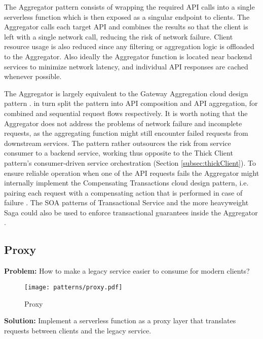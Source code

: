 The Aggregator pattern consists of wrapping the required API calls into a single serverless function which is then exposed as a singular endpoint to clients. The Aggregator calls each target API and combines the results so that the client is left with a single network call, reducing the risk of network failure. Client resource usage is also reduced since any filtering or aggregation logic is offloaded to the Aggregator. Also ideally the Aggregator function is located near backend services to minimize network latency, and individual API responses are cached whenever possible. \parencite{baldini17currentTrends}

The Aggregator is largely equivalent to the Gateway Aggregation cloud design pattern \parencite{microsoft18cloudPatterns}. \textcite{baldini17currentTrends} in turn split the pattern into API composition and API aggregation, for combined and sequential request flows respectively. It is worth noting that the Aggregator does not address the problems of network failure and incomplete requests, as the aggregating function might still encounter failed requests from downstream services. The pattern rather outsources the risk from service consumer to a backend service, working thus opposite to the Thick Client pattern's consumer-driven service orchestration (Section \ref{subsec:thickClient}). To ensure reliable operation when one of the API requests fails the Aggregator might internally implement the Compensating Transactions cloud design pattern, i.e. pairing each request with a compensating action that is performed in case of failure \parencite{microsoft18cloudPatterns}. The SOA patterns of Transactional Service and the more heavyweight Saga could also be used to enforce transactional guarantees inside the Aggregator \parencite{rotem12soa}.

\subsection{Proxy} \label{subsec:proxy}

\textbf{Problem:} How to make a legacy service easier to consume for modern clients?

\begin{figure}[h]
  \centering
  \texttt{[image: patterns/proxy.pdf]}
  \caption{Proxy}
  \label{fig:proxy}
\end{figure}

\textbf{Solution:} Implement a serverless function as a proxy layer that translates requests between clients and the legacy service.

